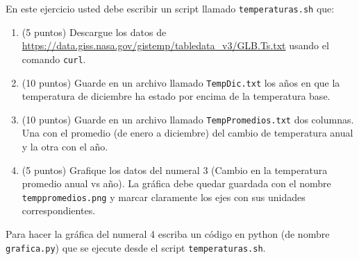 \documentclass[11pt,letterpaper]{exam}
\begin{document}
\begin{questions}
En este ejercicio usted debe escribir un script llamado
\verb"temperaturas.sh" que: 

\begin{enumerate}
\item (5 puntos) Descargue los datos de
\url{https://data.giss.nasa.gov/gistemp/tabledata_v3/GLB.Ts.txt} usando el comando \verb"curl".
\item (10 puntos) Guarde en un archivo llamado \verb"TempDic.txt" los años en
que la temperatura de diciembre ha estado por encima de la temperatura base.
\item (10 puntos) Guarde en un archivo llamado \verb"TempPromedios.txt"
  dos columnas. Una con el promedio (de enero a diciembre) del cambio de temperatura anual y
  la otra con el año.    
\item (5 puntos) Grafique los datos del numeral 3 (Cambio en la temperatura promedio anual vs año). La gr\'afica debe
  quedar guardada con el nombre \verb"temppromedios.png" y marcar
  claramente los ejes con sus unidades correspondientes. 

\end{enumerate}

Para hacer la gráfica del numeral 4 escriba un código en python (de
nombre \verb"grafica.py") que se ejecute desde el script
\verb"temperaturas.sh". 



\end{questions}
\end{document}
